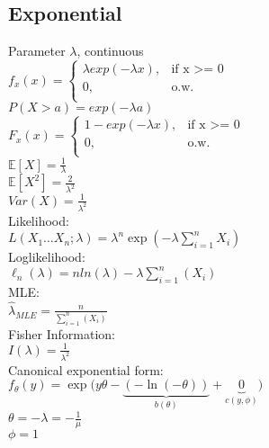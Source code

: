\subsection*{Exponential}
Parameter $\lambda$, continuous\\
$ f_x(x)=
	\begin{cases}
		 \lambda exp(-\lambda x),&\text{if x >= 0}\\
		0,&\text{o.w.}\\
	\end{cases}
$\\
$P(X>a)= exp(-\lambda a)$\\
$ F_x(x)=
	\begin{cases}
		 1-exp(-\lambda x),&\text{if x >= 0}\\
		0,&\text{o.w.}\\
	\end{cases}
$\\
$\mathbb{E}[X]=\frac{1}{\lambda}$\\
$\mathbb{E}[X^2]=\frac{2}{\lambda^2}$\\
$Var(X)=\frac{1}{\lambda^2}$\\
Likelihood:\\
$L(X_1\dots X_n;\lambda)=\lambda^n\exp\left(-\lambda\sum_{i=1}^n X_i\right)$\\
Loglikelihood:\\
$\ell_n (\lambda)= n ln(\lambda) - \lambda \sum_{i=1}^n (X_i)$\\
MLE:\\
$\hat{\lambda}_{MLE}= \frac{n}{\sum^{n}_{i=1}(X_i)}$\\
Fisher Information:\\
$I(\lambda)= \frac{1}{\lambda^2}$\\
Canonical exponential form:\\
$f_{\theta}(y) = \exp\big(y\theta - \underbrace{(-\ln(-\theta))}_{b(\theta)} + \underbrace{0}_{c(y, \phi)}\big)$\\
$\theta = -\lambda = -\frac1{\mu}$\\
$\phi = 1$\\
